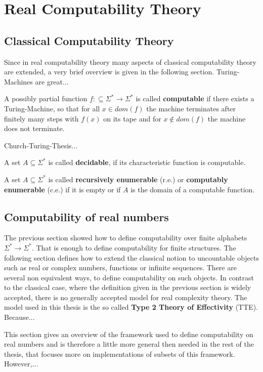 \section{Real Computability Theory}
\subsection{Classical Computability Theory}
 Since in real computability theory many aspects of classical computability theory are extended, 
 a very brief overview is given in the following section.
 Turing-Machines are great...
 \begin{definition}
 	A possibly partial function $f:\subseteq \Sigma^* \to \Sigma^*$ is called \textbf{computable} if there exists 
 	a Turing-Machine, so that for all $x \in dom(f)$ the machine terminates after finitely many steps with $f(x)$ on its 
 	tape and for $x \not \in dom(f)$ the machine does not terminate.
 \end{definition}

 Church-Turing-Thesis...
 \begin{definition}
 	A set $A \subseteq \Sigma^*$ is called \textbf{decidable}, if its characteristic function is computable. 
 \end{definition}
 \begin{definition}
 	A set $A \subseteq \Sigma^*$ is called \textbf{recursively enumerable} (r.e.) or \textbf{computably enumerable} (c.e.) if 
 	it is empty or if $A$ is the domain of a computable function.   
 \end{definition}
\subsection{Computability of real numbers}
The previous section showed how to define computability over finite alphabets $\Sigma^* \to \Sigma^*$. 
That is enough to define computability for finite structures. The following section defines how to extend 
the classical notion to uncountable objects such as real or complex numbers, functions or infinite sequences.
There are several non equivalent ways, to define computability on such objects. 
In contrast to the classical case, where the definition given in the previous section is widely accepted, there is no 
generally accepted model for real complexity theory.
The model used in this thesis is the so called \textbf{Type 2 Theory of Effectivity} (TTE). 
Because... 

This section gives an overview of the framework used to define computability on real numbers and is therefore 
a little more general then needed in the rest of the thesis, that focuses more on implementations of subsets of this framework.
However,...

